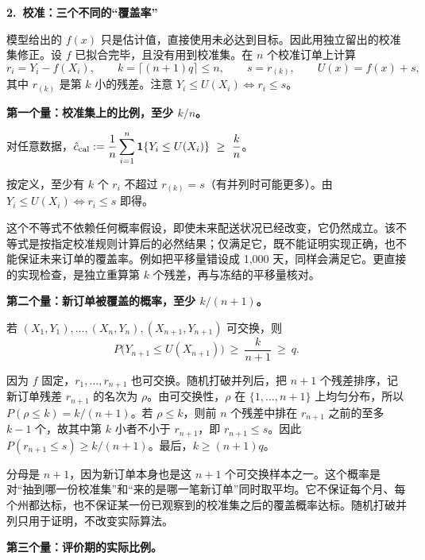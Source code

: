 \documentclass[11pt]{article}
\begin{document}
\bigskip
\textbf{2.\ 校准：三个不同的“覆盖率”}

模型给出的 \(f(x)\) 只是估计值，直接使用未必达到目标。因此用独立留出的校准集修正。设 \(f\) 已拟合完毕，且没有用到校准集。在 \(n\) 个校准订单上计算
\[
r_i=Y_i-f(X_i),\qquad k=\lceil (n+1)q\rceil\le n,\qquad s=r_{(k)},\qquad U(x)=f(x)+s ,
\]
其中 \(r_{(k)}\) 是第 \(k\) 小的残差。注意 \(Y_i\le U(X_i)\iff r_i\le s\)。

\textbf{第一个量：校准集上的比例，至少 \(k/n\)。}

\begin{prop}
对任意数据，\(\displaystyle \hat c_{\mathrm{cal}}:=\frac1n\sum_{i=1}^n \mathbf 1\{Y_i\le U(X_i)\}\ \ge\ \frac kn\)。
\end{prop}

\begin{pf}
按定义，至少有 \(k\) 个 \(r_i\) 不超过 \(r_{(k)}=s\)（有并列时可能更多）。由 \(Y_i\le U(X_i)\iff r_i\le s\) 即得。
\end{pf}

这个不等式不依赖任何概率假设，即使未来配送状况已经改变，它仍然成立。该不等式是按指定校准规则计算后的必然结果；仅满足它，既不能证明实现正确，也不能保证未来订单的覆盖率。例如把平移量错设成 1,000 天，同样会满足它。更直接的实现检查，是独立重算第 \(k\) 个残差，再与冻结的平移量核对。

\textbf{第二个量：新订单被覆盖的概率，至少 \(k/(n+1)\)。}

\begin{prop}
若 \((X_1,Y_1),\dots,(X_n,Y_n),(X_{n+1},Y_{n+1})\) 可交换，则
\[
P\bigl(Y_{n+1}\le U(X_{n+1})\bigr)\ \ge\ \frac{k}{n+1}\ \ge\ q .
\]
\end{prop}

\begin{pf}
因为 \(f\) 固定，\(r_1,\dots,r_{n+1}\) 也可交换。随机打破并列后，把 \(n+1\) 个残差排序，记新订单残差 \(r_{n+1}\) 的名次为 \(\rho\)。由可交换性，\(\rho\) 在 \(\{1,\dots,n+1\}\) 上均匀分布，所以 \(P(\rho\le k)=k/(n+1)\)。若 \(\rho\le k\)，则前 \(n\) 个残差中排在 \(r_{n+1}\) 之前的至多 \(k-1\) 个，故其中第 \(k\) 小者不小于 \(r_{n+1}\)，即 \(r_{n+1}\le s\)。因此 \(P(r_{n+1}\le s)\ge k/(n+1)\)。最后，\(k\ge(n+1)q\)。
\end{pf}

分母是 \(n+1\)，因为新订单本身也是这 \(n+1\) 个可交换样本之一。这个概率是对“抽到哪一份校准集”和“来的是哪一笔新订单”同时取平均。它不保证每个月、每个州都达标，也不保证某一份已观察到的校准集之后的覆盖概率达标。随机打破并列只用于证明，不改变实际算法。

\textbf{第三个量：评价期的实际比例。}
\end{document}
